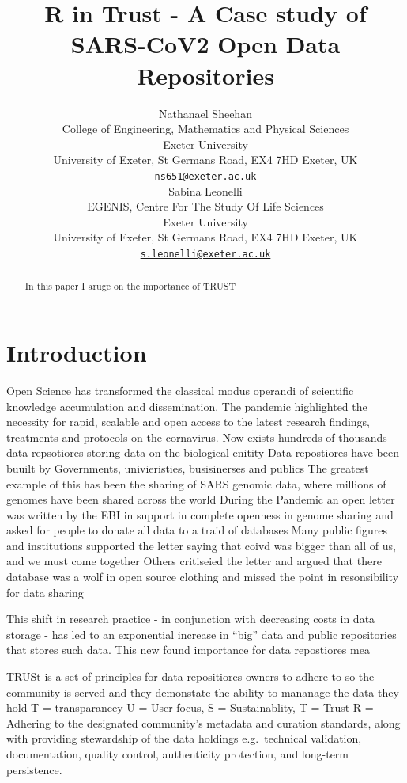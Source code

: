 \documentclass{article}
\title{R in Trust - A Case study of SARS-CoV2 Open Data Repositories}
\author{
    Nathanael Sheehan
   \\
    College of Engineering, Mathematics and Physical Sciences \\
    Exeter University \\
  University of Exeter, St Germans Road, EX4 7HD Exeter, UK \\
  \texttt{\href{mailto:ns651@exeter.ac.uk}{\nolinkurl{ns651@exeter.ac.uk}}} \\
   \And
    Sabina Leonelli
   \\
    EGENIS, Centre For The Study Of Life Sciences \\
    Exeter University \\
  University of Exeter, St Germans Road, EX4 7HD Exeter, UK \\
  \texttt{\href{mailto:s.leonelli@exeter.ac.uk}{\nolinkurl{s.leonelli@exeter.ac.uk}}} \\
  }
\begin{document}
\maketitle


\begin{abstract}
In this paper I aruge on the importance of TRUST
\end{abstract}


\hypertarget{introduction}{%
\section{Introduction}\label{introduction}}

Open Science has transformed the classical modus operandi of scientific
knowledge accumulation and dissemination. The pandemic highlighted the
necessity for rapid, scalable and open access to the latest research
findings, treatments and protocols on the cornavirus. Now exists
hundreds of thousands data repsotiores storing data on the biological
enitity Data repostiores have been buuilt by Governments, univieristies,
busisinerses and publics The greatest example of this has been the
sharing of SARS genomic data, where millions of genomes have been shared
across the world During the Pandemic an open letter was written by the
EBI in support in complete openness in genome sharing and asked for
people to donate all data to a traid of databases Many public figures
and institutions supported the letter saying that coivd was bigger than
all of us, and we must come together Others critiseied the letter and
argued that there database was a wolf in open source clothing and missed
the point in resonsibility for data sharing

This shift in research practice - in conjunction with decreasing costs
in data storage - has led to an exponential increase in ``big'' data and
public repositories that stores such data. This new found importance for
data repostiores mea

TRUSt is a set of principles for data repositiores owners to adhere to
so the community is served and they demonstate the ability to mananage
the data they hold T = transparancey U = User focus, S = Sustainablity,
T = Trust R = Adhering to the designated community's metadata and
curation standards, along with providing stewardship of the data
holdings e.g.~technical validation, documentation, quality control,
authenticity protection, and long-term persistence.
\end{document}
